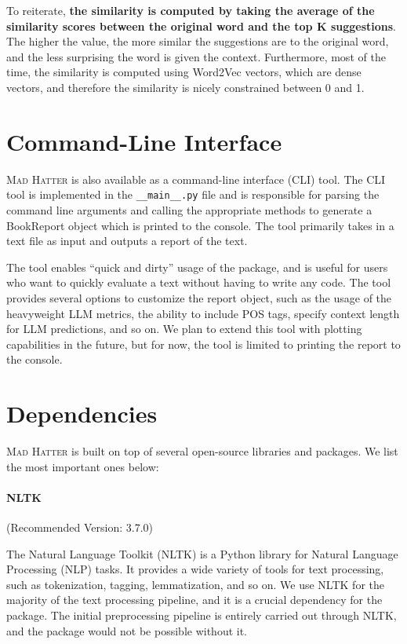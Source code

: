\begin{description}
        To reiterate, \textbf{the similarity is computed by taking the average of the similarity scores between the original word and the top K suggestions}. The higher the value, the more similar the suggestions are to the original word, and the less surprising the word is given the context. Furthermore, most of the time, the similarity is computed using Word2Vec vectors, which are dense vectors, and therefore the similarity is nicely constrained  between 0 and 1.

        
\end{description} 

\section{Command-Line Interface}

\textsc{Mad Hatter} is also available as a command-line interface (CLI) tool. The CLI tool is implemented in the \texttt{\_\_main\_\_.py} file and is responsible for parsing the command line arguments and calling the appropriate methods to generate a BookReport object which is printed to the console. The tool primarily takes in a text file as input and outputs a report of the text. 

The tool enables ``quick and dirty'' usage of the package, and is useful for users who want to quickly evaluate a text without having to write any code. The tool provides several options to customize the report object, such as the usage of the heavyweight LLM metrics, the ability to include POS tags, specify context length for LLM predictions, and so on. We plan to extend this tool with plotting capabilities in the future, but for now, the tool is limited to printing the report to the console.

\section{Dependencies}

\textsc{Mad Hatter} is built on top of several open-source libraries and packages. We list the most important ones below:

\paragraph{NLTK}  (Recommended Version: 3.7.0)


The Natural Language Toolkit (NLTK) is a Python library for Natural Language Processing (NLP) tasks. It provides a wide variety of tools for text processing, such as tokenization, tagging, lemmatization, and so on. We use NLTK for the majority of the text processing pipeline, and it is a crucial dependency for the package. The initial preprocessing pipeline is entirely carried out through NLTK, and the package would not be possible without it.

